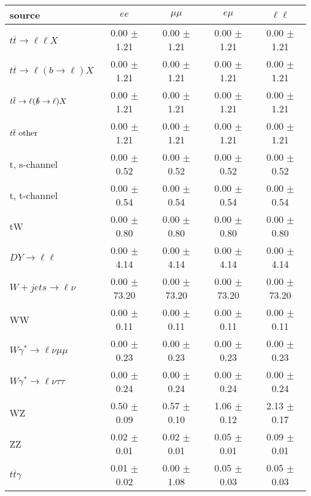 \begin{tabular}{l|cccc} \hline\hline
source & $ee$ & $\mu\mu$ & $e\mu$ & $\ell\ell $ \\
\hline
$t\overline{t} \rightarrow \ell \ell X$ &  0.00 $\pm$  1.21 &  0.00 $\pm$  1.21 &  0.00 $\pm$  1.21 &  0.00 $\pm$  1.21 \\
$t\overline{t} \rightarrow \ell (b \rightarrow \ell) X$ &  0.00 $\pm$  1.21 &  0.00 $\pm$  1.21 &  0.00 $\pm$  1.21 &  0.00 $\pm$  1.21 \\
$t\overline{t} \rightarrow \ell (\slashed b \rightarrow \ell) X$ &  0.00 $\pm$  1.21 &  0.00 $\pm$  1.21 &  0.00 $\pm$  1.21 &  0.00 $\pm$  1.21 \\
        $t\overline{t}\ \rm{other}$ &  0.00 $\pm$  1.21 &  0.00 $\pm$  1.21 &  0.00 $\pm$  1.21 &  0.00 $\pm$  1.21 \\
\hline
                       t, s-channel &  0.00 $\pm$  0.52 &  0.00 $\pm$  0.52 &  0.00 $\pm$  0.52 &  0.00 $\pm$  0.52 \\
                       t, t-channel &  0.00 $\pm$  0.54 &  0.00 $\pm$  0.54 &  0.00 $\pm$  0.54 &  0.00 $\pm$  0.54 \\
                                 tW &  0.00 $\pm$  0.80 &  0.00 $\pm$  0.80 &  0.00 $\pm$  0.80 &  0.00 $\pm$  0.80 \\
\hline
         $DY \rightarrow \ell \ell$ &  0.00 $\pm$  4.14 &  0.00 $\pm$  4.14 &  0.00 $\pm$  4.14 &  0.00 $\pm$  4.14 \\
      $W+jets \rightarrow \ell \nu$ &  0.00 $\pm$ 73.20 &  0.00 $\pm$ 73.20 &  0.00 $\pm$ 73.20 &  0.00 $\pm$ 73.20 \\
                                 WW &  0.00 $\pm$  0.11 &  0.00 $\pm$  0.11 &  0.00 $\pm$  0.11 &  0.00 $\pm$  0.11 \\
\hline
$W\gamma^{*} \rightarrow \ell \nu \mu\mu$ &  0.00 $\pm$  0.23 &  0.00 $\pm$  0.23 &  0.00 $\pm$  0.23 &  0.00 $\pm$  0.23 \\
$W\gamma^{*} \rightarrow \ell \nu \tau\tau$ &  0.00 $\pm$  0.24 &  0.00 $\pm$  0.24 &  0.00 $\pm$  0.24 &  0.00 $\pm$  0.24 \\
                                 WZ &  0.50 $\pm$  0.09 &  0.57 $\pm$  0.10 &  1.06 $\pm$  0.12 &  2.13 $\pm$  0.17 \\
                                 ZZ &  0.02 $\pm$  0.01 &  0.02 $\pm$  0.01 &  0.05 $\pm$  0.01 &  0.09 $\pm$  0.01 \\
\hline
              $t\overline{t}\gamma$ &  0.01 $\pm$  0.02 &  0.00 $\pm$  1.08 &  0.05 $\pm$  0.03 &  0.05 $\pm$  0.03 \\

\end{tabular}
